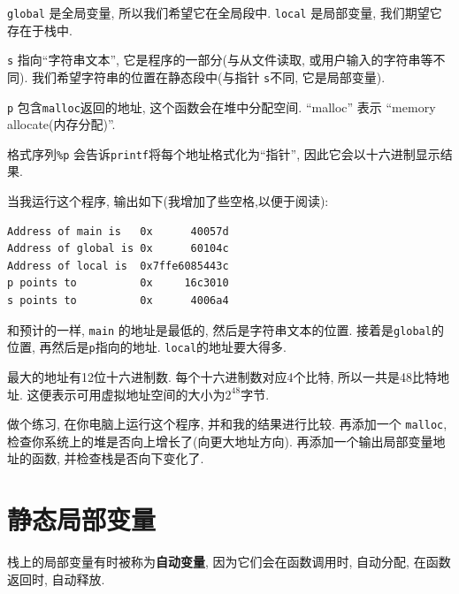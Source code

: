 \documentclass[12pt]{book}
\begin{document}
{{\tt global} 是全局变量, 所以我们希望它在全局段中. 
{\tt local} 是局部变量, 我们期望它存在于栈中.

{\tt s} 指向``字符串文本'', 它是程序的一部分(与从文件读取, 
或用户输入的字符串等不同). 我们希望字符串的位置在静态段中(与指针
{\tt s}不同, 它是局部变量).

{\tt p} 包含{\tt malloc}返回的地址, 
这个函数会在堆中分配空间. ``malloc'' 表示 ``memory allocate(内存分配)''.

格式序列\verb"%p" 会告诉{\tt printf}将每个地址格式化为``指针'',
因此它会以十六进制显示结果.

当我运行这个程序, 输出如下(我增加了些空格,以便于阅读):


\begin{verbatim}
Address of main is   0x      40057d
Address of global is 0x      60104c
Address of local is  0x7ffe6085443c
p points to          0x     16c3010
s points to          0x      4006a4

\end{verbatim}
%
%
和预计的一样, {\tt main} 的地址是最低的, 然后是字符串文本的位置.
接着是{\tt global}的位置, 再然后是{\tt p}指向的地址.
{\tt local}的地址要大得多.

最大的地址有12位十六进制数. 每个十六进制数对应4个比特,
所以一共是48比特地址. 这便表示可用虚拟地址空间的大小为$2^{48}$字节.

做个练习, 在你电脑上运行这个程序, 并和我的结果进行比较.
再添加一个 {\tt malloc}, 检查你系统上的堆是否向上增长了(向更大地址方向).
再添加一个输出局部变量地址的函数, 并检查栈是否向下变化了.

\section{静态局部变量}
%
%
栈上的局部变量有时被称为{\bf 自动变量},
因为它们会在函数调用时, 自动分配, 在函数返回时, 自动释放.

}
\end{document}
